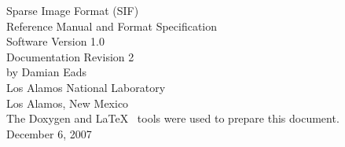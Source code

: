 \documentclass[letterpaper]{article}
\begin{document}
\begin{titlepage}
\vspace*{7cm}
\begin{center}
{\Large Sparse Image Format (SIF)\\Reference Manual and Format Specification\\[1ex]\large
  Software Version 1.0\\[1ex]Documentation Revision 2}\\
\vspace*{1cm}
{\large by Damian Eads}\\
\vspace*{1cm}
{\large Los Alamos National Laboratory\\Los Alamos, New Mexico}\\
\vspace*{1cm}
{\large The Doxygen and \LaTeX~ tools were used to prepare this document.}\\
\vspace*{0.5cm}
{\small December 6, 2007}\\
\end{center}
\end{titlepage}
\end{document}
